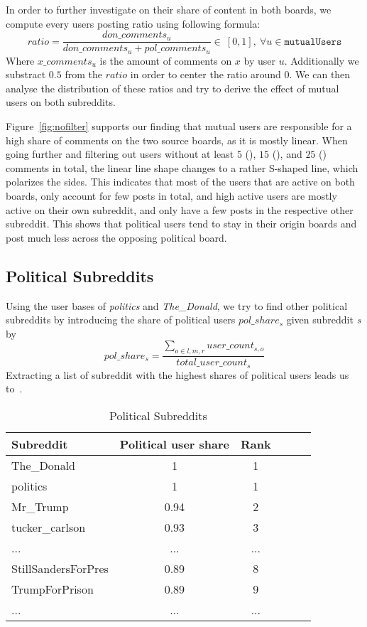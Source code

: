 \documentclass[runningheads,a4paper]{llncs}
\newcommand{\boards}[1]{\textit{politics} #1 \textit{The\_Donald}}
\begin{document}
	In order to further investigate on their share of content in both boards, we compute every users posting ratio using following formula:
	\[
	ratio = \frac{don\_comments_u}{don\_comments_u + pol\_comments_u} \in ~[0,1],~\forall u \in \texttt{mutualUsers}
	\]
	Where $x\_comments_u$ is the amount of comments on $x$ by user $u$. Additionally we substract $0.5$ from the $ratio$ in order to center the ratio around 0. We can then analyse the distribution of these ratios and try to derive the effect of mutual users on both subreddits.
	
	Figure~\ref{fig:nofilter} supports our finding that mutual users are responsible for a high share of comments on the two source boards, as it is mostly linear.
	When going further and filtering out users without at least $5$ (), $15$ (), and $25$ () comments in total, the linear line shape changes to a rather S-shaped line, which polarizes the sides. This indicates that most of the users that are active on both boards, only account for few posts in total, and high active users are mostly active on their own subreddit, and only have a few posts in the respective other subreddit.
	This shows that political users tend to stay in their origin boards and post much less across the opposing political board.
	\subsection{Political Subreddits}\label{sub:cross_subreddit_political_subreddits}
	Using the user bases of \boards{and}, we try to find other political subreddits by introducing the share of political users $pol\_share_s$ given subreddit \textit{s} by
	$$pol\_share_s = \frac{\sum_{o \in {l,m,r}} user\_count_{s,o}}{total\_user\_count_s}$$
	Extracting a list of subreddit with the highest shares of political users leads us to~.
	
	\begin{table}
		\caption{Political Subreddits}
		\label{table:share_users_subreddits}
		\centering
		\setlength{\tabcolsep}{5px}
		\begin{tabular}{lccccc}
			\hline\hline
			Subreddit  & Political user share & Rank \\
			\hline
			The\_Donald     & 1 & 1\\
			politics & 1 & 1\\
			Mr\_Trump      & 0.94 & 2 \\
			tucker\_carlson & 0.93 & 3 \\
			...             & ... & ...\\
			StillSandersForPres & 0.89 & 8 \\
			TrumpForPrison  & 0.89 & 9 \\
			...             & ... & ...\\
			\hline\hline
		\end{tabular}
		\label{table:political_subreddits}
	\end{table}
	
\end{document}
